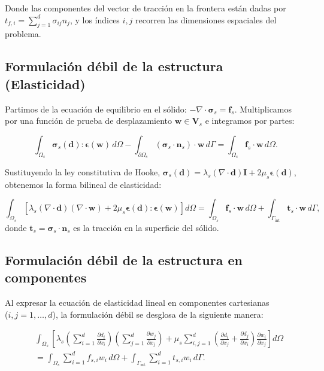 \documentclass[12pt, letterpaper]{report}
\theoremstyle{definition}
\begin{document}
Donde las componentes del vector de tracción en la frontera están dadas por \\ $t_{f,i} = \sum_{j=1}^d \sigma_{ij} n_j$, y los índices $i, j$ recorren las dimensiones espaciales del problema.

\subsection{Formulación débil de la estructura (Elasticidad)}

Partimos de la ecuación de equilibrio en el sólido: $-\nabla \cdot \boldsymbol{\sigma}_s = \mathbf{f}_s$. Multiplicamos por una función de prueba de desplazamiento $\mathbf{w} \in \mathbf{V}_s$ e integramos por partes:

\[
\int_{\Omega_s} \boldsymbol{\sigma}_s(\mathbf{d}) : \boldsymbol{\epsilon}(\mathbf{w}) \, d\Omega - \int_{\partial \Omega_s} (\boldsymbol{\sigma}_s \cdot \mathbf{n}_s) \cdot \mathbf{w} \, d\Gamma = \int_{\Omega_s} \mathbf{f}_s \cdot \mathbf{w} \, d\Omega.
\]

Sustituyendo la ley constitutiva de Hooke, $\boldsymbol{\sigma}_s(\mathbf{d}) = \lambda_s (\nabla \cdot \mathbf{d})\mathbf{I} + 2\mu_s \boldsymbol{\epsilon}(\mathbf{d})$, obtenemos la forma bilineal de elasticidad:

\begin{equation} \label{eq:weak_solid}
    \int_{\Omega_s} \left[ \lambda_s (\nabla \cdot \mathbf{d})(\nabla \cdot \mathbf{w}) + 2\mu_s \boldsymbol{\epsilon}(\mathbf{d}) : \boldsymbol{\epsilon}(\mathbf{w}) \right] d\Omega = \int_{\Omega_s} \mathbf{f}_s \cdot \mathbf{w} \, d\Omega + \int_{\Gamma_{\text{int}}} \mathbf{t}_s \cdot \mathbf{w} \, d\Gamma,
\end{equation}
donde $\mathbf{t}_s = \boldsymbol{\sigma}_s \cdot \mathbf{n}_s$ es la tracción en la superficie del sólido.

\subsection{Formulación débil de la estructura en componentes}

Al expresar la ecuación de elasticidad lineal en componentes cartesianas \\($i, j = 1, \dots, d$), la formulación débil se desglosa de la siguiente manera:

\begin{equation} \label{eq:solid_weak_components}
\begin{split}
    &\int_{\Omega_s} \left[ \lambda_s \left( \sum_{i=1}^d \frac{\partial d_i}{\partial x_i} \right) \left( \sum_{j=1}^d \frac{\partial w_j}{\partial x_j} \right) + \mu_s \sum_{i,j=1}^d \left( \frac{\partial d_i}{\partial x_j} + \frac{\partial d_j}{\partial x_i} \right) \frac{\partial w_i}{\partial x_j} \right] d\Omega \\
    &= \int_{\Omega_s} \sum_{i=1}^d f_{s,i} w_i \, d\Omega + \int_{\Gamma_{\text{int}}} \sum_{i=1}^d t_{s,i} w_i \, d\Gamma.
\end{split}
\end{equation}
\end{document}
